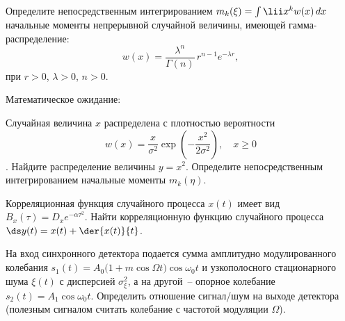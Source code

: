 \documentclass[pscyr]{hedwork}
\begin{document}
  \maketitle

  \begin{task}{4}{
    Определите непосредственным интегрированием
    \( m_k(\xi) = \int\lii x^k w(x)\,dx \) начальные моменты непрерывной
    случайной величины, имеющей гамма-распределение:
    \[
      w(x) = \frac{\lambda^n}{\Gamma(n)}\,r^{n - 1} e^{-\lambda r},
    \]
    при \( r > 0 \), \( \lambda > 0 \), \( n > 0 \).
  }

    Математическое ожидание:
  \end{task}

  \begin{task}{14}{
    Случайная величина \( x \) распределена с плотностью вероятности
    \[
      w(x) = \frac{x}{\sigma^2}\exp\left(-\frac{x^2}{2\sigma^2}\right),
        \quad x \ge 0
    \].
    Найдите распределение величины \( y = x^2 \). Определите непосредственным
    интегрированием начальные моменты \( m_k(\eta) \).
  }
    
  \end{task}
  
  \begin{task}{37}{
    Корреляционная функция случайного процесса \( x(t) \) имеет вид
    \( B_x(\tau) = D_x e^{-\alpha \tau^2} \). Найти корреляционную функцию
    случайного процесса \( \ds y(t) = x(t) + \der{x(t)}{t} \).
  }
  
  \end{task}
  
  \begin{task*}{47}{
    На вход синхронного детектора подается сумма амплитудно модулированного
    колебания \( s_1(t) = A_0 \bigl(1 + m\cos\Omega t\big) \cos\omega_0 t \)
    и узкополосного стационарного шума \( \xi(t) \) с дисперсией
    \( \sigma_\xi^2 \), а на другой~-- опорное колебание
    \( s_2(t) = A_1\cos\omega_0 t \). Определить отношение сигнал/шум на выходе
    детектора (полезным сигналом считать колебание с частотой модуляции
    \( \Omega \)).
  }
  
  \end{task*}
\end{document}
